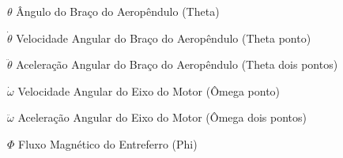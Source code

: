 \begin{simbolos}
    \item[$ \theta $] Ângulo do Braço do Aeropêndulo (Theta)
    \item[$ \dot{\theta} $] Velocidade Angular do Braço do Aeropêndulo (Theta ponto)
    \item[$ \ddot{\theta} $] Aceleração Angular do Braço do Aeropêndulo (Theta dois pontos)
    \item[$ \dot{\omega} $] Velocidade Angular do Eixo do Motor (Ômega ponto)
    \item[$ \ddot{\omega} $] Aceleração Angular do Eixo do Motor (Ômega dois pontos)
    \item[$ \Phi $] Fluxo Magnético do Entreferro (Phi)
\end{simbolos}